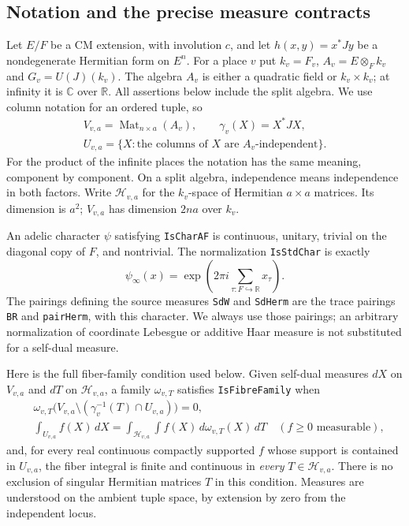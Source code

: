 \documentclass[11pt,a4paper]{article}
\numberwithin{equation}{section}
\theoremstyle{remark}\newtheorem{remark}[theorem]{Remark}
\begin{document}
\subsection{Notation and the precise measure contracts}

Let $E/F$ be a CM extension, with involution $c$, and let
$h(x,y)=x^*Jy$ be a nondegenerate Hermitian form on $E^n$.
For a place $v$ put $k_v=F_v$, $A_v=E\otimes_F k_v$ and
$G_v=U(J)(k_v)$.  The algebra $A_v$ is either a quadratic field or
$k_v\times k_v$; at infinity it is $\mathbb C$ over $\mathbb R$.
All assertions below include the split algebra.  We use column notation
for an ordered tuple, so
\[
 \begin{gathered}
 V_{v,a}=\operatorname{Mat}_{n\times a}(A_v),\qquad
 \gamma_v(X)=X^*JX,\\
 U_{v,a}=\{X:\text{the columns of }X\text{ are }A_v\text{-independent}\}.
 \end{gathered}
 \tag{GMR.1}
\]
For the product of the infinite places the notation has the same
meaning, component by component.  On a split algebra, independence
means independence in both factors.  Write $\mathcal H_{v,a}$ for the
$k_v$-space of Hermitian $a\times a$ matrices.  Its dimension is $a^2$;
$V_{v,a}$ has dimension $2na$ over $k_v$.

An adelic character $\psi$ satisfying \texttt{Is\allowbreak Char\allowbreak AF} is continuous,
unitary, trivial on the diagonal copy of $F$, and nontrivial.  The
normalization \texttt{Is\allowbreak Std\allowbreak Char} is exactly
\[
 \psi_\infty(x)=\exp\left(2\pi i\sum_{\tau:F\hookrightarrow\mathbb R}x_\tau\right).
 \tag{GMR.2}
\]
The pairings defining the source measures \texttt{Sd\allowbreak W} and
\texttt{Sd\allowbreak Herm} are the trace pairings \texttt{BR} and
\texttt{pair\allowbreak Herm}, with this character.  We always use those pairings;
an arbitrary normalization of coordinate Lebesgue or additive Haar
measure is not substituted for a self-dual measure.

Here is the full fiber-family condition used below.  Given self-dual
measures $dX$ on $V_{v,a}$ and $dT$ on $\mathcal H_{v,a}$, a family
$\omega_{v,T}$ satisfies \texttt{Is\allowbreak Fibre\allowbreak Family} when
\[
\begin{split}
 &\omega_{v,T}\bigl(V_{v,a}\setminus(\gamma_v^{-1}(T)\cap U_{v,a})\bigr)=0,\\
 &\int_{U_{v,a}} f(X)\,dX
       =\int_{\mathcal H_{v,a}}\int f(X)\,d\omega_{v,T}(X)\,dT
       \quad(f\geq0\text{ measurable}),
\end{split}
 \tag{GMR.3}
\]
and, for every real continuous compactly supported $f$ whose support is
contained in $U_{v,a}$, the fiber integral is finite and continuous in
\emph{every} $T\in\mathcal H_{v,a}$.  There is no exclusion of singular
Hermitian matrices $T$ in this condition.  Measures are understood on
the ambient tuple space, by extension by zero from the independent
locus.
\end{document}
